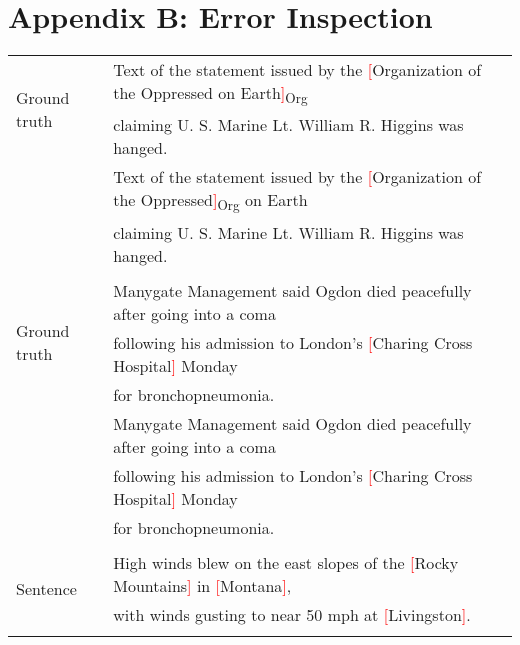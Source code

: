 \documentclass[11pt,a4paper]{article}
\begin{document}
\section*{Appendix B: Error Inspection}
\label{sec:err}
\begin{table*}[t]
    \centering

    \begin{tabular}{ll}
    \Xhline{3\arrayrulewidth}
    \multicolumn{2}{c}{\textbf{(a)} Incorrect NE span} \\
    \hline
    \multirow{2}{*}{Ground truth} & Text of the statement issued by the \textcolor{red}{[}Organization of the Oppressed on Earth\textcolor{red}{]}\textsubscript{\sc Org}   \\
    &  claiming U. S. Marine Lt. William R. Higgins was hanged. \\
    \hdashline
    \multirow{2}{*}{Prediction} & Text of the statement issued by the \textcolor{red}{[}Organization of the Oppressed\textcolor{red}{]}\textsubscript{\sc Org} on Earth \\
    & claiming U. S. Marine Lt. William R. Higgins was hanged. \\
    \Xhline{2\arrayrulewidth}
    \multicolumn{2}{c}{\textbf{(b)} Incorrect NE type} \\
    \hline
    \multirow{3}{*}{Ground truth} & Manygate Management said Ogdon died peacefully after going into a coma \\
    & following his admission to London's \textcolor{red}{[}Charing Cross Hospital\textcolor{red}{]} Monday \\ & for bronchopneumonia. \\   
    \hdashline
    \multirow{3}{*}{Prediction} & Manygate Management said Ogdon died peacefully after going into a coma \\
    & following his admission to London's \textcolor{red}{[}Charing Cross Hospital\textcolor{red}{]} Monday\\
    & for bronchopneumonia. \\   
    \Xhline{2\arrayrulewidth}
    \multicolumn{2}{c}{\textbf{(c)} Lack of knowledge} \\
    \hline
    \multirow{2}{*}{Sentence} & High winds blew on the east slopes of the \textcolor{red}{[}Rocky Mountains\textcolor{red}{]} in \textcolor{red}{[}Montana\textcolor{red}{]}, \\ & with winds gusting to near 50 mph at \textcolor{red}{[}Livingston\textcolor{red}{]}.\\
    \hdashline
    \multirow{3}{*}{Ground Truth} &  \\

\end{tabular}
\end{table*}
\end{document}
